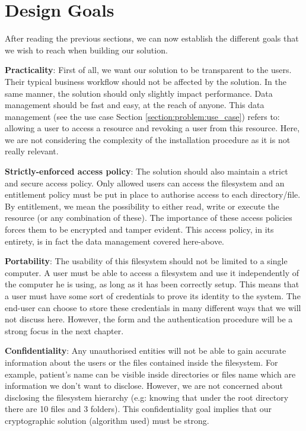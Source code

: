 \documentclass[../main.tex]{subfiles}
\begin{document}
\section{Design Goals}
\label{section:problem:design_goals}

\par After reading the previous sections, we can now establish the different goals that we wish to reach when building our solution.
\par \textbf{Practicality}: First of all, we want our solution to be transparent to the users. Their typical business workflow should not be affected by the solution. In the same manner, the solution should only slightly impact performance. Data management should be fast and easy, at the reach of anyone.  This data management (see the use case Section \ref{section:problem:use_case}) refers to: allowing a  user to access a resource and revoking a user from this resource. Here, we are not considering the complexity of the installation procedure as it is not really relevant.
\par \textbf{Strictly-enforced access policy}: The solution should also maintain a strict and secure access policy. Only allowed users can access the filesystem and an entitlement policy must be put in place to authorise access to each directory/file. By entitlement, we mean the possibility to either read, write or execute the resource (or any combination of these). The importance of these access policies forces them to be encrypted and tamper evident. This access policy, in its entirety, is in fact the data management covered here-above.
\par \textbf{Portability}: The usability of this filesystem should not be limited to a single computer. A user must be able to access a filesystem and use it independently of the computer he is using, as long as it has been correctly setup. This means that a user must have some sort of credentials to prove its identity to the system. The end-user can choose to store these credentials in many different ways that we will not discuss here. However, the form and the authentication procedure will be a strong focus in the next chapter.
\par \textbf{Confidentiality}: Any unauthorised entities will not be able to gain accurate information about the users or the files contained inside the filesystem. For example, patient's name can be visible inside directories or files name which are information we don't want to disclose. However, we are not concerned about disclosing the filesystem hierarchy (e.g: knowing that under the root directory there are 10 files and 3 folders). This confidentiality goal implies that our cryptographic solution (algorithm used) must be strong. 
\end{document}
